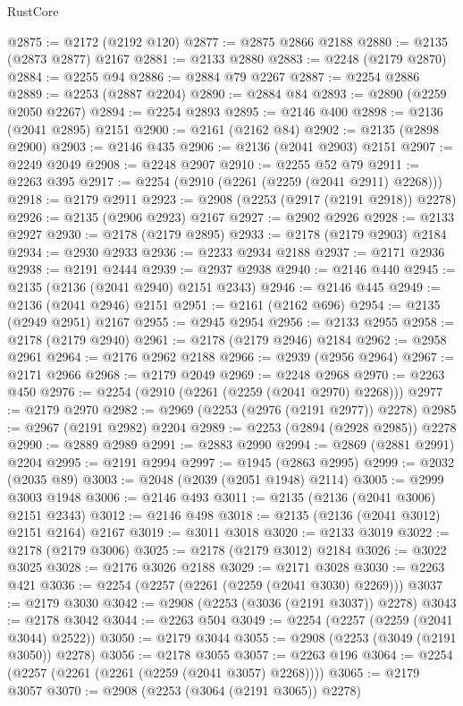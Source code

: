 \begin{lexlean}{RustCore}
\begin{coremodule}
@2875 := @2172 (@2192 @120)
@2877 := @2875 @2866 @2188
@2880 := @2135 (@2873 @2877) @2167
@2881 := @2133 @2880
@2883 := @2248 (@2179 @2870)
@2884 := @2255 @94
@2886 := @2884 @79 @2267
@2887 := @2254 @2886
@2889 := @2253 (@2887 @2204)
@2890 := @2884 @84
@2893 := @2890 (@2259 @2050 @2267)
@2894 := @2254 @2893
@2895 := @2146 @400
@2898 := @2136 (@2041 @2895) @2151
@2900 := @2161 (@2162 @84)
@2902 := @2135 (@2898 @2900)
@2903 := @2146 @435
@2906 := @2136 (@2041 @2903) @2151
@2907 := @2249 @2049
@2908 := @2248 @2907
@2910 := @2255 @52 @79
@2911 := @2263 @395
@2917 := @2254 (@2910 (@2261 (@2259 (@2041 @2911) @2268)))
@2918 := @2179 @2911
@2923 := @2908 (@2253 (@2917 (@2191 @2918)) @2278)
@2926 := @2135 (@2906 @2923) @2167
@2927 := @2902 @2926
@2928 := @2133 @2927
@2930 := @2178 (@2179 @2895)
@2933 := @2178 (@2179 @2903) @2184
@2934 := @2930 @2933
@2936 := @2233 @2934 @2188
@2937 := @2171 @2936
@2938 := @2191 @2444
@2939 := @2937 @2938
@2940 := @2146 @440
@2945 := @2135 (@2136 (@2041 @2940) @2151 @2343)
@2946 := @2146 @445
@2949 := @2136 (@2041 @2946) @2151
@2951 := @2161 (@2162 @696)
@2954 := @2135 (@2949 @2951) @2167
@2955 := @2945 @2954
@2956 := @2133 @2955
@2958 := @2178 (@2179 @2940)
@2961 := @2178 (@2179 @2946) @2184
@2962 := @2958 @2961
@2964 := @2176 @2962 @2188
@2966 := @2939 (@2956 @2964)
@2967 := @2171 @2966
@2968 := @2179 @2049
@2969 := @2248 @2968
@2970 := @2263 @450
@2976 := @2254 (@2910 (@2261 (@2259 (@2041 @2970) @2268)))
@2977 := @2179 @2970
@2982 := @2969 (@2253 (@2976 (@2191 @2977)) @2278)
@2985 := @2967 (@2191 @2982) @2204
@2989 := @2253 (@2894 (@2928 @2985)) @2278
@2990 := @2889 @2989
@2991 := @2883 @2990
@2994 := @2869 (@2881 @2991) @2204
@2995 := @2191 @2994
@2997 := @1945 (@2863 @2995)
@2999 := @2032 (@2035 @89)
@3003 := @2048 (@2039 (@2051 @1948) @2114)
@3005 := @2999 @3003 @1948
@3006 := @2146 @493
@3011 := @2135 (@2136 (@2041 @3006) @2151 @2343)
@3012 := @2146 @498
@3018 := @2135 (@2136 (@2041 @3012) @2151 @2164) @2167
@3019 := @3011 @3018
@3020 := @2133 @3019
@3022 := @2178 (@2179 @3006)
@3025 := @2178 (@2179 @3012) @2184
@3026 := @3022 @3025
@3028 := @2176 @3026 @2188
@3029 := @2171 @3028
@3030 := @2263 @421
@3036 := @2254 (@2257 (@2261 (@2259 (@2041 @3030) @2269)))
@3037 := @2179 @3030
@3042 := @2908 (@2253 (@3036 (@2191 @3037)) @2278)
@3043 := @2178 @3042
@3044 := @2263 @504
@3049 := @2254 (@2257 (@2259 (@2041 @3044) @2522))
@3050 := @2179 @3044
@3055 := @2908 (@2253 (@3049 (@2191 @3050)) @2278)
@3056 := @2178 @3055
@3057 := @2263 @196
@3064 := @2254 (@2257 (@2261 (@2261 (@2259 (@2041 @3057) @2268))))
@3065 := @2179 @3057
@3070 := @2908 (@2253 (@3064 (@2191 @3065)) @2278)

\end{coremodule}
\end{lexlean}
